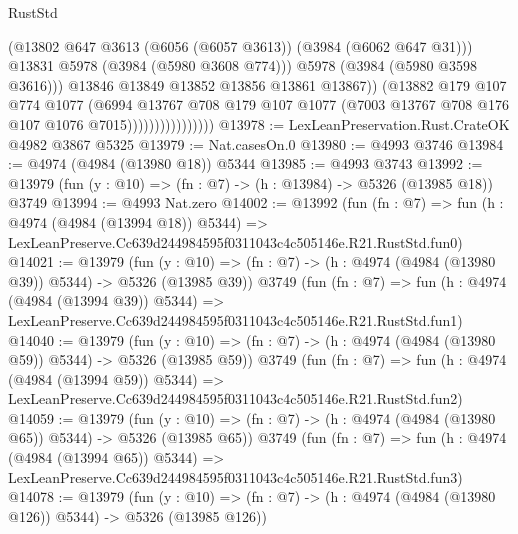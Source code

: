 \begin{lexlean}{RustStd}
\begin{coremodule}
                                      (@13802
                                        @647
                                        @3613
                                        (@6056 (@6057 @3613))
                                        (@3984 (@6062 @647 @31)))
                                      @13831
                                      @5978
                                      (@3984 (@5980 @3608 @774)))
                                    @5978
                                    (@3984 (@5980 @3598 @3616)))
                                  @13846
                                  @13849
                                  @13852
                                  @13856
                                  @13861
                                  @13867))
                              (@13882
                                @179
                                @107
                                @774
                                @1077
                                (@6994
                                  @13767
                                  @708
                                  @179
                                  @107
                                  @1077
                                  (@7003 @13767 @708 @176 @107 @1076 @7015))))))))))))))))
@13978 := LexLeanPreservation.Rust.CrateOK @4982 @3867 @5325
@13979 := Nat.casesOn.{0}
@13980 := @4993 @3746
@13984 := @4974 (@4984 (@13980 @18)) @5344
@13985 := @4993 @3743
@13992 := @13979 (fun (y : @10) => (fn : @7) -> (h : @13984) -> @5326 (@13985 @18)) @3749
@13994 := @4993 Nat.zero
@14002 := @13992
    (fun (fn : @7) =>
    fun (h : @4974 (@4984 (@13994 @18)) @5344) =>
    LexLeanPreserve.Cc639d244984595f0311043c4c505146e.R21.RustStd.fun0)
@14021 := @13979
    (fun (y : @10) => (fn : @7) -> (h : @4974 (@4984 (@13980 @39)) @5344) -> @5326 (@13985 @39))
    @3749
    (fun (fn : @7) =>
    fun (h : @4974 (@4984 (@13994 @39)) @5344) =>
    LexLeanPreserve.Cc639d244984595f0311043c4c505146e.R21.RustStd.fun1)
@14040 := @13979
    (fun (y : @10) => (fn : @7) -> (h : @4974 (@4984 (@13980 @59)) @5344) -> @5326 (@13985 @59))
    @3749
    (fun (fn : @7) =>
    fun (h : @4974 (@4984 (@13994 @59)) @5344) =>
    LexLeanPreserve.Cc639d244984595f0311043c4c505146e.R21.RustStd.fun2)
@14059 := @13979
    (fun (y : @10) => (fn : @7) -> (h : @4974 (@4984 (@13980 @65)) @5344) -> @5326 (@13985 @65))
    @3749
    (fun (fn : @7) =>
    fun (h : @4974 (@4984 (@13994 @65)) @5344) =>
    LexLeanPreserve.Cc639d244984595f0311043c4c505146e.R21.RustStd.fun3)
@14078 := @13979
    (fun (y : @10) => (fn : @7) -> (h : @4974 (@4984 (@13980 @126)) @5344) -> @5326 (@13985 @126))

\end{coremodule}
\end{lexlean}
